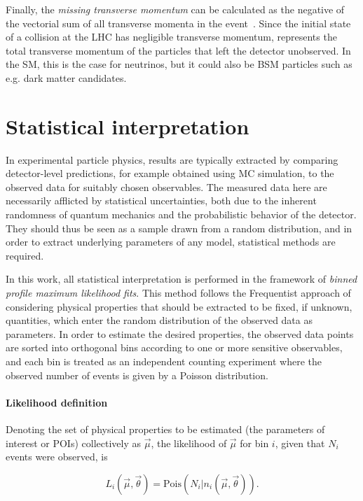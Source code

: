 Finally, the \textit{missing transverse momentum} \ptmissvec can be calculated as the negative of the vectorial sum of all transverse momenta in the event~\cite{CMS:JME-17-001}. Since the initial state of a collision at the LHC has negligible transverse momentum, \ptmissvec represents the total transverse momentum of the particles that left the detector unobserved. In the SM, this is the case for neutrinos, but it could also be BSM particles such as e.g. dark matter candidates.

\section{Statistical interpretation}
\label{sec:methods:stat}

In experimental particle physics, results are typically extracted by comparing detector-level predictions, for example obtained using MC simulation, to the observed data for suitably chosen observables. The measured data here are necessarily afflicted by statistical uncertainties, both due to the inherent randomness of quantum mechanics and the probabilistic behavior of the detector. They should thus be seen as a sample drawn from a random distribution, and in order to extract underlying parameters of any model, statistical methods are required.

In this work, all statistical interpretation is performed in the framework of \textit{binned profile maximum likelihood fits}. This method follows the Frequentist approach of considering physical properties that should be extracted to be fixed, if unknown, quantities, which enter the random distribution of the observed data as parameters. In order to estimate the desired properties, the observed data points are sorted into orthogonal bins according to one or more sensitive observables, and each bin is treated as an independent counting experiment where the observed number of events is given by a Poisson distribution. 

\paragraph{Likelihood definition}
Denoting the set of physical properties to be estimated (the parameters of interest or POIs) collectively as $\vec{\mu}$, the likelihood of $\vec{\mu}$ for bin $i$, given that $N_i$ events were observed, is~\cite{Cowan:2010js}

\begin{equation}
    L_i (\vec{\mu}, \vec{\theta}) = \mathrm{Pois} \left(N_i | n_i (\vec{\mu}, \vec{\theta}) \right).
\end{equation}

